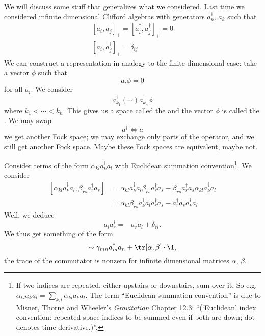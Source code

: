 We will discuss some stuff that generalizes what we
considered. Last time we considered infinite dimensional Clifford
algebras with generators $a^{\dagger}_{k}$, $a_{k}$ such that
\begin{subequations}
\begin{align}
[a_{i},a_{j}]_{+} = [a^{\dagger}_{i}, a^{\dagger}_{j}]_{+} = 0\\
[a_{i}, a^{\dagger}_{j}]_{+} = \delta_{ij}
\end{align}
\end{subequations}
We can construct a representation in analogy to the finite
dimensional case: take a vector $\phi$ such that
\begin{equation}
a_{i}\phi = 0
\end{equation}
for all $a_{i}$. We consider
\begin{equation}
a^{\dagger}_{k_{1}}(\cdots)a^{\dagger}_{k_{n}}\phi
\end{equation}
where $k_{1}<\cdots<k_{n}$. This gives us a space called the
 and the vector $\phi$ is called the
. We may swap
\begin{equation}
a^{\dagger}\iff a
\end{equation}
we get another Fock space; we may exchange only parts of the
operator, and we still get another Fock space. Maybe these Fock
spaces are equivalent, maybe not.

Consider terms of the form $\alpha_{kl}a^{\dagger}_{k}a_{l}$ with
Euclidean summation convention\footnote{If two indices are
  repeated, either upstairs or downstairs, sum over it. So
  e.g. $\alpha_{kl}a_{k}a_{l}=\sum_{k,l}\alpha_{kl}a_{k}a_{l}$. The
  term ``Euclidean summation convention'' is due to Misner,
  Thorne and Wheeler's \emph{Gravitation} Chapter 12.3:
  ``(`Euclidean' index convention: repeated space indices to be
  summed even if both are down; dot denotes time derivative.)''.}. We consider
\begin{subequations}
\begin{align}
[\alpha_{kl}a^{\dagger}_{k}a_{l}, \beta_{rs}a^{\dagger}_{r}a_{s}]
&= \alpha_{kl}a^{\dagger}_{k}a_{l}\beta_{rs}a^{\dagger}_{r}a_{s}
- \beta_{rs}a^{\dagger}_{r}a_{s}\alpha_{kl}a^{\dagger}_{k}a_{l}\\
&= \alpha_{kl}\beta_{rs}a^{\dagger}_{k}a_{l}a^{\dagger}_{r}a_{s}
- a^{\dagger}_{r}a_{s}a^{\dagger}_{k}a_{l}
\end{align}
\end{subequations}
Well, we deduce
\begin{equation}
a_{l}a^{\dagger}_{r} = -a^{\dagger}_{r}a_{l}+\delta_{rl}.
\end{equation}
We thus get something of the form
\begin{equation}
[\alpha_{kl}a^{\dagger}_{k}a_{l}, \beta_{rs}a^{\dagger}_{r}a_{s}]
\sim \gamma_{mn}a^{\dagger}_{m}a_{n}+\tr[\alpha,\beta]\cdot\1,
\end{equation}
the trace of the commutator is nonzero for infinite dimensional
matrices $\alpha$, $\beta$.

